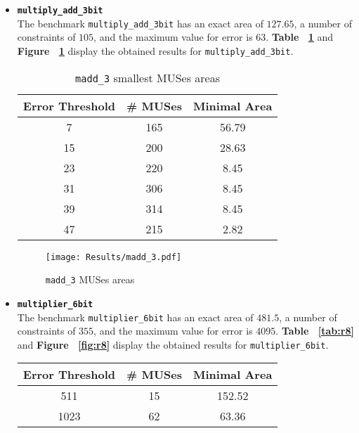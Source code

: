 \documentclass[]{usiinfbachelorproject}
\begin{document}
\begin{itemize}
    \item \texttt{\textbf{multiply\_add\_3bit}}\\
        The benchmark \texttt{multiply\_add\_3bit} has an exact area of $127.65$, a number of constraints of $105$, and the maximum value for error is $63$. \textbf{Table ~\ref{tab:r7}} and \textbf{Figure ~\ref{fig:r7}} display the obtained results for \texttt{multiply\_add\_3bit}.
        \begin{table}[H]
            \centering
            \begin{tabular}{c|c|c}
                \textbf{Error Threshold} & \textbf{\# MUSes} & \textbf{Minimal Area} \\ \hline
                7 & 165 & 56.79 \\
                \hline
                15 & 200 & 28.63 \\
                \hline
                23 & 220 & 8.45 \\
                \hline
                31 & 306 & 8.45 \\
                \hline
                39 & 314 & 8.45 \\
                \hline
                47 & 215 & 2.82    
            \end{tabular}
            \caption{\texttt{madd\_3} smallest MUSes areas}
            \label{tab:r7}
        \end{table}
        \begin{figure}[H]
            \centering
            \texttt{[image: Results/madd\_3.pdf]}
            \caption{\texttt{madd\_3} MUSes areas}
            \label{fig:r7}
        \end{figure}
    \item \texttt{\textbf{multiplier\_6bit}}\\
        The benchmark \texttt{multiplier\_6bit} has an exact area of $481.5$, a number of constraints of $355$, and the maximum value for error is $4095$. \textbf{Table ~\ref{tab:r8}} and \textbf{Figure ~\ref{fig:r8}} display the obtained results for \texttt{multiplier\_6bit}.
        \begin{table}[H]
            \centering
            \begin{tabular}{c|c|c}
                \textbf{Error Threshold} & \textbf{\# MUSes} & \textbf{Minimal Area} \\ \hline
                511 & 15 & 152.52 \\
                \hline
                1023 & 62 & 63.36 \\

\end{tabular}
\end{table}
\end{itemize}
\end{document}

